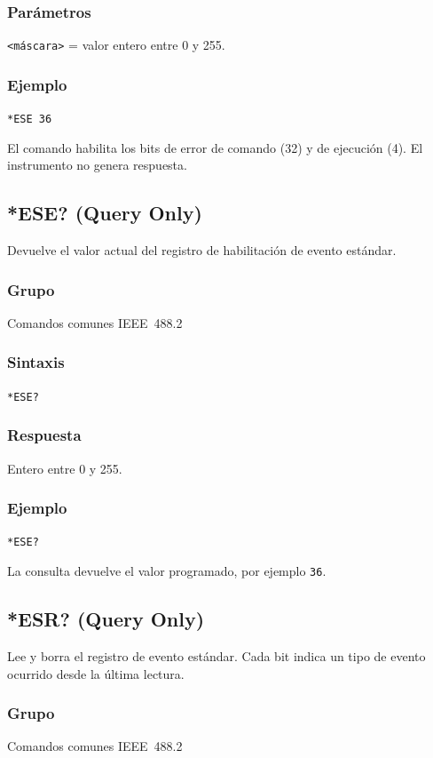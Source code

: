 \subsubsection*{Parámetros}
\texttt{<máscara>} = valor entero entre 0 y 255.

\subsubsection*{Ejemplo}
\texttt{*ESE 36}

El comando habilita los bits de error de comando (32) y de ejecución (4). El instrumento no genera respuesta.

\subsection*{*ESE? (Query Only)}

Devuelve el valor actual del registro de habilitación de evento estándar.

\subsubsection*{Grupo}
Comandos comunes IEEE~488.2

\subsubsection*{Sintaxis}
\texttt{*ESE?}

\subsubsection*{Respuesta}
Entero entre 0 y 255.

\subsubsection*{Ejemplo}
\texttt{*ESE?}

La consulta devuelve el valor programado, por ejemplo \texttt{36}.

\subsection*{*ESR? (Query Only)}

Lee y borra el registro de evento estándar. Cada bit indica un tipo de evento ocurrido desde la última lectura.

\subsubsection*{Grupo}
Comandos comunes IEEE~488.2

